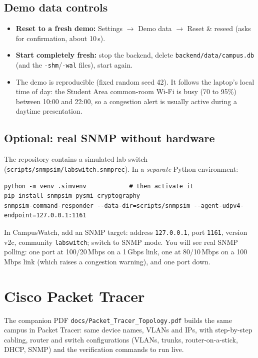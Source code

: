 \documentclass[11pt,a4paper]{article}
\newcommand{\code}[1]{\texttt{#1}}
\newcommand{\file}[1]{\texttt{\color{ink}#1}}
\begin{document}
\subsection{Demo data controls}
\begin{itemize}
  \item \textbf{Reset to a fresh demo:} Settings $\rightarrow$ Demo data $\rightarrow$ Reset \& reseed (asks for confirmation, about 10\,s).
  \item \textbf{Start completely fresh:} stop the backend, delete \file{backend/data/campus.db} (and the \code{-shm}/\code{-wal} files), start again.
  \item The demo is reproducible (fixed random seed 42). It follows the laptop's local time of day: the Student Area common-room
        Wi-Fi is busy (70 to 95\%) between 10:00 and 22:00, so a congestion alert is usually active during a daytime presentation.
\end{itemize}

\subsection{Optional: real SNMP without hardware}
The repository contains a simulated lab switch (\file{scripts/snmpsim/labswitch.snmprec}). In a \emph{separate} Python environment:
\begin{lstlisting}
python -m venv .simvenv            # then activate it
pip install snmpsim pysmi cryptography
snmpsim-command-responder --data-dir=scripts/snmpsim --agent-udpv4-endpoint=127.0.0.1:1161
\end{lstlisting}
In CampusWatch, add an SNMP target: address \code{127.0.0.1}, port \code{1161}, version v2c, community \code{labswitch}; switch to
SNMP mode. You will see real SNMP polling: one port at 100/20\,Mbps on a 1\,Gbps link, one at 80/10\,Mbps on a 100\,Mbps link
(which raises a congestion warning), and one port down.

\section{Cisco Packet Tracer}

The companion PDF \file{docs/Packet\_Tracer\_Topology.pdf} builds the same campus in Packet Tracer: same device names, VLANs and
IPs, with step-by-step cabling, router and switch configurations (VLANs, trunks, router-on-a-stick, DHCP, SNMP) and the
verification commands to run live.
\end{document}
